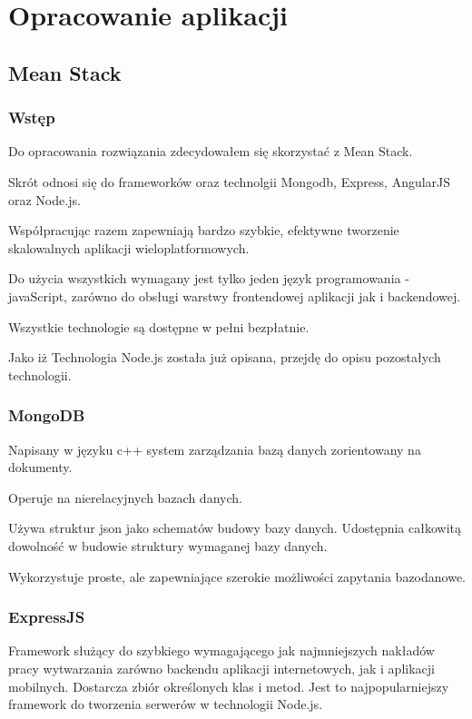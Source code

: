 \documentclass[12pt]{report}
\begin{document}
\chapter{Opracowanie aplikacji}

\section{Mean Stack}

\subsection{Wstęp}
Do opracowania rozwiązania zdecydowałem się skorzystać z Mean Stack.

Skrót odnosi się do frameworków oraz technolgii Mongodb, Express, AngularJS oraz Node.js.

Współpracując razem zapewniają bardzo szybkie, efektywne tworzenie skalowalnych aplikacji wieloplatformowych.

Do użycia wszystkich wymagany jest tylko jeden język programowania - javaScript, zarówno do obsługi warstwy frontendowej aplikacji jak i backendowej.

Wszystkie technologie są dostępne w pełni bezpłatnie.


Jako iż Technologia Node.js została już opisana, przejdę do opisu pozostałych technologii.

\subsection{MongoDB}
Napisany w języku c++ system zarządzania bazą danych zorientowany na dokumenty.

Operuje na nierelacyjnych bazach danych.

Używa struktur json jako schematów budowy bazy danych.
Udostępnia całkowitą dowolność w budowie struktury wymaganej bazy danych.

Wykorzystuje proste, ale zapewniające szerokie możliwości zapytania bazodanowe.

\subsection{ExpressJS }
Framework służący do szybkiego wymagającego jak najmniejszych nakładów pracy wytwarzania zarówno backendu aplikacji internetowych, jak i aplikacji mobilnych.
Dostarcza zbiór określonych klas i metod.
Jest to najpopularniejszy framework do tworzenia serwerów w technologii Node.js.
\end{document}
